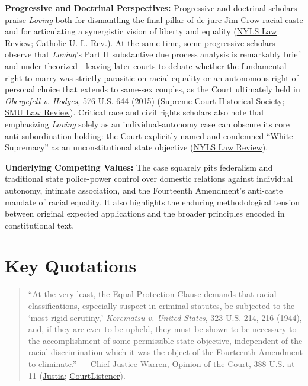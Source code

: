 \documentclass[12pt]{article}
\begin{document}
\textbf{Progressive and Doctrinal Perspectives:} Progressive and doctrinal scholars praise \textit{Loving} both for dismantling the final pillar of de jure Jim Crow racial caste and for articulating a synergistic vision of liberty and equality (\href{https://digitalcommons.nyls.edu/cgi/viewcontent.cgi?article=1091&context=nyls_law_review}{NYLS Law Review}; \href{https://scholarship.law.edu/cgi/viewcontent.cgi?article=3486&context=lawreview}{Catholic U. L. Rev.}). At the same time, some progressive scholars observe that \textit{Loving}'s Part II substantive due process analysis is remarkably brief and under-theorized---leaving later courts to debate whether the fundamental right to marry was strictly parasitic on racial equality or an autonomous right of personal choice that extends to same-sex couples, as the Court ultimately held in \textit{Obergefell v. Hodges}, 576 U.S. 644 (2015) (\href{https://civics.supremecourthistory.org/article/loving-v-virginia/}{Supreme Court Historical Society}; \href{https://scholar.smu.edu/cgi/viewcontent.cgi?article=4964&context=smulr}{SMU Law Review}). Critical race and civil rights scholars also note that emphasizing \textit{Loving} solely as an individual-autonomy case can obscure its core anti-subordination holding: the Court explicitly named and condemned ``White Supremacy'' as an unconstitutional state objective (\href{https://digitalcommons.nyls.edu/cgi/viewcontent.cgi?article=1091&context=nyls_law_review}{NYLS Law Review}).

\textbf{Underlying Competing Values:} The case squarely pits federalism and traditional state police-power control over domestic relations against individual autonomy, intimate association, and the Fourteenth Amendment's anti-caste mandate of racial equality. It also highlights the enduring methodological tension between original expected applications and the broader principles encoded in constitutional text.

\section{Key Quotations}
\begin{quote}
``At the very least, the Equal Protection Clause demands that racial classifications, especially suspect in criminal statutes, be subjected to the `most rigid scrutiny,' \textit{Korematsu v. United States}, 323 U.S. 214, 216 (1944), and, if they are ever to be upheld, they must be shown to be necessary to the accomplishment of some permissible state objective, independent of the racial discrimination which it was the object of the Fourteenth Amendment to eliminate.''
--- Chief Justice Warren, Opinion of the Court, 388 U.S. at 11 (\href{https://supreme.justia.com/cases/federal/us/388/1/}{Justia}; \href{https://www.courtlistener.com/opinion/107480/loving-v-virginia/}{CourtListener}).
\end{quote}
\end{document}
